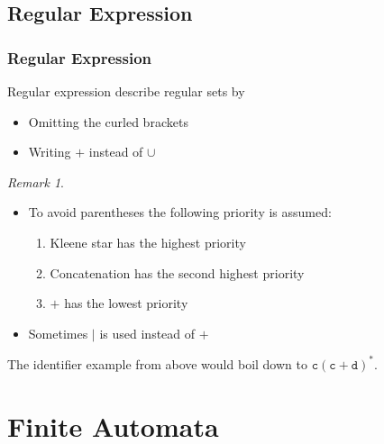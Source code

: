 \documentclass{beamer}
\theoremstyle{remark}
\newtheorem{remark}[theorem]{Remark}
\begin{document}
\subsection{Regular Expression}
\begin{frame}
	\frametitle{Regular Expression}
	Regular expression describe regular sets by
	\begin{itemize}
		\item Omitting the curled brackets
		\item Writing $+$ instead of $\cup$
	\end{itemize}
	
	\pause
	
	\begin{remark}
		\begin{itemize}
			\item To avoid parentheses the following priority is assumed:
			\begin{enumerate}
				\item Kleene star has the highest priority
				\item Concatenation has the second highest priority
				\item $+$ has the lowest priority 
			\end{enumerate}
			
			\item Sometimes $\mid$ is used instead of $+$
		\end{itemize}
	\end{remark}
	
	\pause
	
	\begin{example}
		The identifier example from above would boil down to $\mathtt{c}(\mathtt{c}+\mathtt{d})^*$.
	\end{example}
\end{frame}

\section{Finite Automata}
\end{document}
